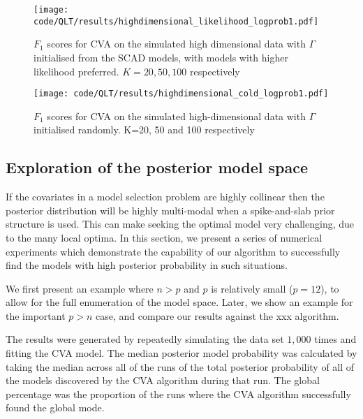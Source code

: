 \documentclass{amsart}[12pt]
\begin{document}
\begin{figure}\label{fig:highdim_warm_start_likelihood}
\caption{$F_1$ scores for CVA on the simulated high dimensional data with $\Gamma$ initialised from the SCAD models, with models with higher likelihood preferred. $K=20, 50, 100$ respectively}
\texttt{[image: code/QLT/results/highdimensional\_likelihood\_logprob1.pdf]}
\end{figure}

\begin{figure}\label{fig:highdim_cold_start}
\caption{$F_1$ scores for CVA on the simulated high-dimensional data with $\Gamma$ initialised randomly.
					K=20, 50 and 100 respectively}
\texttt{[image: code/QLT/results/highdimensional\_cold\_logprob1.pdf]}
\end{figure}

\subsection{Exploration of the posterior model space}

If the covariates in a model selection problem are highly collinear then the posterior distribution will be
highly multi-modal when a spike-and-slab prior structure is used. This can make seeking the optimal model very
challenging, due to the many local optima. In this section, we present a series of numerical experiments which
demonstrate the capability of our algorithm to successfully find the models with high posterior probability in
such situations.

We first present an example where $n > p$ and $p$ is relatively small ($p = 12$), to allow for the full 
enumeration of the model space. Later, we show an example for the important $p > n$ case, and compare our results 
against the xxx algorithm.

The results were generated by repeatedly simulating the data set $1,000$ times and fitting the CVA model.
The median posterior model probability was calculated by taking the median across all of the runs of the
total posterior probability of all of the models discovered by the CVA algorithm during that run. The global
percentage was the proportion of the runs where the CVA algorithm successfully found the global mode.
\end{document}
